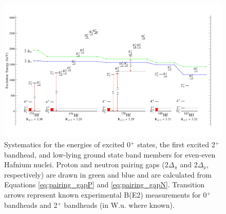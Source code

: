 \begin{landscape}
\begin{figure}[ht] 
\begin{center}
\includegraphics[height=0.8\textheight]{SciDraw_HfSystematics.pdf}
\caption{Systematics for the energies of excited 0$^+$ states, the first excited 2$^+$ bandhead, and low-lying ground state band members for even-even Hafnium nuclei. Proton and neutron pairing gaps (2$\Delta_\pi$ and 2$\Delta_\nu$, respectively) are drawn in green and blue and are calculated from Equations \ref{eq:pairing_gapP} and \ref{eq:pairing_gapN}. Transition arrows represent known experimental B(E2) measurements for 0$^+$ bandheads and 2$^+$ bandheads (in W.u. where known).
\label{fig:HfSystematics}}
\end{center}
\end{figure}
\end{landscape}

